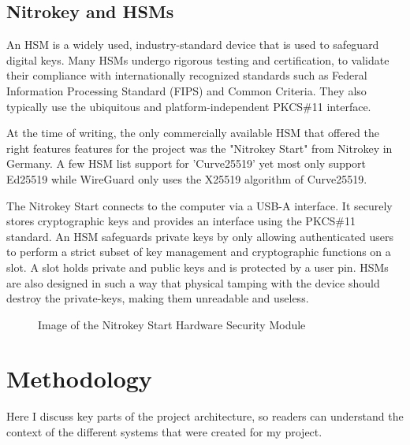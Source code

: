 \documentclass [11pt, proquest] {uwthesis}[2020/02/24]
\begin{document}
\section{Nitrokey and HSMs}
An HSM is a widely used, industry-standard device that is used to safeguard digital keys. Many HSMs undergo rigorous testing and certification, to validate their compliance with internationally recognized standards such as Federal Information Processing Standard (FIPS) and Common Criteria. They also typically use the ubiquitous and platform-independent PKCS\#11 interface. 

At the time of writing, the only commercially available HSM that offered the right features features for the project was the "Nitrokey Start" from Nitrokey in Germany\cite{noauthor_nitrokey_2022}. A few HSM list support for 'Curve25519' yet most only support Ed25519 while WireGuard only uses the X25519 algorithm of Curve25519.

The Nitrokey Start connects to the computer via a USB-A interface. It securely stores cryptographic keys and provides an interface using the PKCS\#11 standard.
An HSM safeguards private keys by only allowing authenticated users to perform a strict subset of key management and cryptographic functions on a slot. A slot holds private and public keys and is protected by a user pin. HSMs are also designed in such a way that physical tamping with the device should destroy the private-keys, making them unreadable and useless. 
\begin{figure}[ht]
\caption{Image of the Nitrokey Start Hardware Security Module}
\label{img:nitrokey}
\end{figure}

\chapter {Methodology}
Here I discuss key parts of the project architecture, so readers can understand the context of the different systems that were created for my project.
\end{document}
